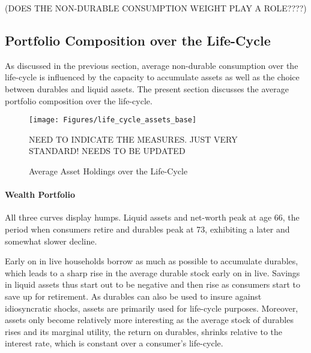 \documentclass[a4paper,12pt,legno]{article}
\begin{document}
(DOES THE NON-DURABLE CONSUMPTION WEIGHT PLAY A ROLE????) 

\subsection{Portfolio Composition over the Life-Cycle}
As discussed in the previous section, average non-durable consumption over the life-cycle is influenced by the capacity to accumulate assets as well as the choice between durables and liquid assets. The present section discusses the average portfolio composition over the life-cycle. 

\begin{figure}[!htbp]
\caption{Average Asset Holdings over the Life-Cycle} 
\label{asset_holdings_life_cycle}	%
\centering
\texttt{[image: Figures/life\_cycle\_assets\_base]}  %

\begin{minipage}{0.8\linewidth}
\footnotesize{NEED TO INDICATE THE MEASURES. JUST VERY STANDARD! NEEDS TO BE UPDATED}
\end{minipage}

\end{figure}

\paragraph{Wealth Portfolio} All three curves display humps. Liquid assets and net-worth peak at age 66, the period when consumers retire and durables peak at 73, exhibiting a later and somewhat slower decline. 

Early on in live households borrow as much as possible to accumulate durables, which leads to a sharp rise in the average durable stock early on in live. Savings in liquid assets thus start out to be negative and then rise as consumers start to save up for retirement. As durables can also be used to insure against idiosyncratic shocks, assets are primarily used for life-cycle purposes. Moreover, assets only become relatively more interesting as the average stock of durables rises and its marginal utility, the return on durables, shrinks relative to the interest rate, which is constant over a consumer's life-cycle.
\end{document}

